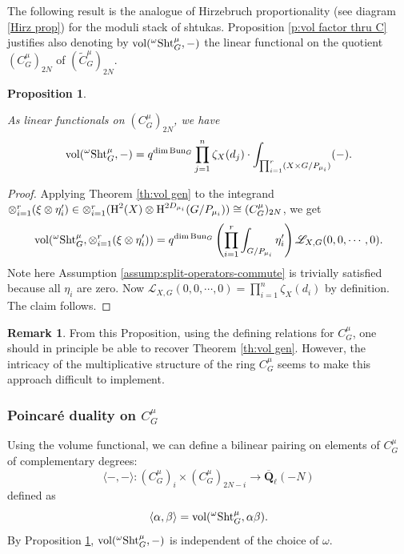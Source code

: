 \documentclass[reqno]{amsart}
\numberwithin{equation}{subsection}
\newtheorem{prop}[subsubsection]{Proposition}
\theoremstyle{definition}
\newtheorem{remark}[subsubsection]{Remark}
\newcommand{\sL}{{\mathscr{L}}}
\newcommand{\Bun}{\textup{Bun}}
\newcommand\Frob{\textup{Frob}}
\newcommand\Sht{\textup{Sht}}
\newcommand{\Tr}{\textup{Tr}}
\newcommand{\vol}{\textup{vol}}
\newcommand{\Qlbar}{\overline{\Q}_\ell}
\renewcommand{\j}[1]{\langle{#1}\rangle}
\newcommand{\wt}[1]{\widetilde{#1}}
\newcommand\ot{\otimes}
\newcommand{\cohog}[2]{\textup{H}^{#1}({#2})}     %
\newcommand\mt{\mapsto}
\renewcommand\a\alpha
\renewcommand\b\beta
\newcommand{\y}{\eta}
\newcommand{\z}{\zeta}
\newcommand{\om}{\omega}
\newcommand{\Q}{\mathbf{Q}}
\newcommand{\rH}{\ensuremath{\mathrm{H}}\xspace}
\begin{document}

The following result is the analogue of Hirzebruch proportionality (see diagram \eqref{Hirz prop}) for the moduli stack of shtukas.
Proposition \ref{p:vol factor thru C} justifies also denoting by $\vol({}^\omega \Sht_G^\mu, -)$ the linear functional on the quotient $(C^\mu_G)_{2N}$ of $(\wt C^\mu_G)_{2N}$.

\begin{prop}\label{p:vol on taut}

    As linear functionals on $(C^\mu_G)_{2N}$, we have
    \begin{equation*}
        \vol({}^\om\Sht^\mu_G, -)=q^{\dim \Bun_G}\prod_{j=1}^n\z_X(d_j)\cdot \int_{\prod_{i=1}^r (X\times G/P_{\mu_i})}(-).
    \end{equation*}
\end{prop}
\begin{proof}
    Applying Theorem \ref{th:vol gen} to the integrand $\ot_{i=1}^r(\xi\ot \y'_i)\in \ot_{i=1}^r(\cohog{2}{X}\ot \cohog{2D_{\mu_i}}{G/P_{\mu_i}})\cong (C^\mu_G)_{2N}$, we get
    \begin{equation*}
        \vol({}^\om\Sht^\mu_G, \ot_{i=1}^r(\xi\ot \y'_i))=q^{\dim\Bun_G}\left(\prod_{i=1}^r\int_{G/P_{\mu_i}}\y'_i\right)\sL_{X,G}(0,0,\cdots,0).
    \end{equation*}
    Note here Assumption \ref{assump:split-operators-commute} is trivially satisfied because all $\y_i$ are zero. Now $\sL_{X,G}(0,0,\cdots,0)=\prod_{i=1}^n\z_X(d_i)$ by definition. The claim follows.
\end{proof}

\begin{remark}
From this Proposition, using the defining relations for $C^\mu_G$, one should in principle be able to recover Theorem \ref{th:vol gen}. However, the intricacy of the multiplicative structure of the ring  $C^\mu_G$ seems to make this approach difficult to implement.
\end{remark}

\subsubsection{Poincar\'e duality on $C^\mu_G$}\label{sss:taut duality}
Using the volume functional, we can define a bilinear pairing on elements of $C^\mu_G$ of complementary degrees:
\begin{equation*}
    \j{-,-}: (C^\mu_G)_{i}\times (C^\mu_G)_{2N-i}\to \Qlbar(-N)
\end{equation*}
defined as
\begin{equation*}
\j{\a,\b}= \vol({}^\om\Sht^\mu_G, \a\b).
\end{equation*}
By Proposition \ref{p:vol on taut}, $\vol({}^\om\Sht^\mu_G, -)$ is independent of the choice of $\om$.
\end{document}
